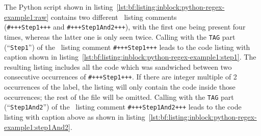 		\newpage
		The Python script shown in \mbox{listing \ref{lst:bf:listing:inblock:python-regex-example1:raw}} contains two different \productName~listing comments\\ (\lstinline$#+++Step1+++$ and \lstinline$#+++Step1And2+++$), with the first one being present four times, whereas the latter one is only seen twice.
		Calling 
		\label{lst:bf:listings:inblock:example-no-caption}
		with the \lstinline$TAG$ part (\enquote{\lstinline$Step1$}) of the \productName~listing comment \lstinline$#+++Step1+++$ leads to the code listing with caption shown in \mbox{listing \ref{lst:bf:listing:inblock:python-regex-example1:step1}}.
		\lstset{style=Python}
		The resulting listing includes all the code which was sandwiched between two consecutive occurrences of \lstinline$#+++Step1+++$. If there are
		integer multiple of 2 occurrences of the label, the listing will only contain the code inside those occurrences; the rest of the file will be omitted.
		Calling  
		with the \lstinline$TAG$ part (\enquote{\lstinline$Step1And2$}) of the \productName~listing comment \lstinline$#+++Step1And2+++$ leads to the code listing with caption above as shown in \mbox{listing \ref{lst:bf:listing:inblock:python-regex-example1:step1And2}}.
		\lstset{style=Python}
		
